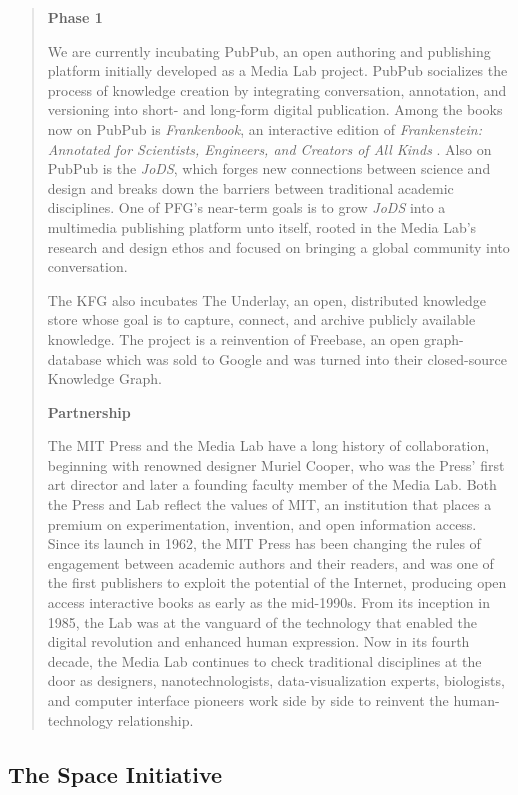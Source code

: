 \begin{quote}
\textbf{Phase 1}

We are currently incubating PubPub, an open authoring and publishing platform initially developed as a Media Lab project. PubPub socializes the process of knowledge creation by integrating conversation, annotation, and versioning into short- and long-form digital publication. Among the books now on PubPub is \textit{Frankenbook}, an interactive edition of \textit{Frankenstein: Annotated for Scientists, Engineers, and Creators of All Kinds} \cite{shelley2017frankenstein}. Also on PubPub is the \textit{\ac{JoDS}}, which forges new connections between science and design and breaks down the barriers between traditional academic disciplines. One of PFG's near-term goals is to grow \textit{JoDS} into a multimedia publishing platform unto itself, rooted in the Media Lab's research and design ethos and focused on bringing a global community into conversation. 

The \ac{KFG} also incubates The Underlay, an open, distributed knowledge store whose goal is to capture, connect, and archive publicly available knowledge. The project is a reinvention of Freebase, an open graph-database which was sold to Google and was turned into their closed-source Knowledge Graph.

\textbf{Partnership}

The MIT Press and the Media Lab have a long history of collaboration, beginning with renowned designer Muriel Cooper, who was the Press' first art director and later a founding faculty member of the Media Lab. Both the Press and Lab reflect the values of MIT, an institution that places a premium on experimentation, invention, and open information access. Since its launch in 1962, the MIT Press has been changing the rules of engagement between academic authors and their readers, and was one of the first publishers to exploit the potential of the Internet, producing open access interactive books as early as the mid-1990s. From its inception in 1985, the Lab was at the vanguard of the technology that enabled the digital revolution and enhanced human expression. Now in its fourth decade, the Media Lab continues to check traditional disciplines at the door as designers, nanotechnologists, data-visualization experts, biologists, and computer interface pioneers work side by side to reinvent the human-technology relationship. 
\end{quote}

\subsection{The Space Initiative}
\label{sec:spaceinitiative}

